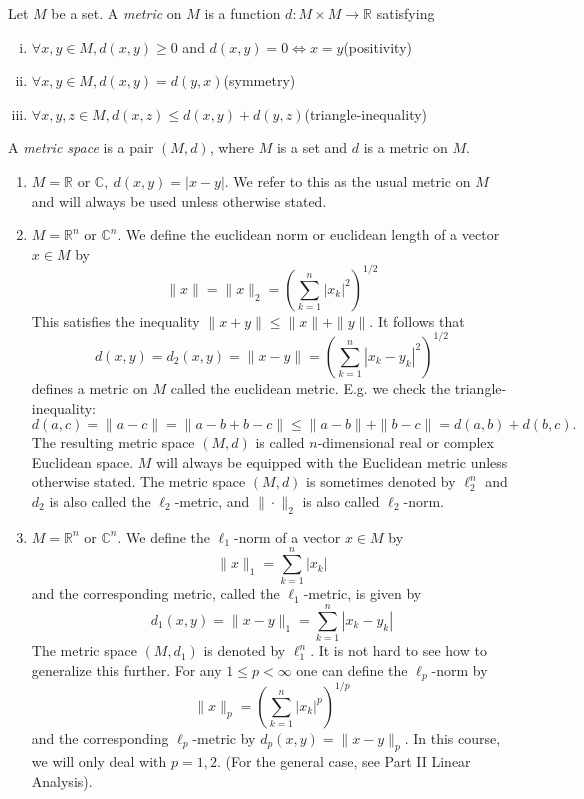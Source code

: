 \documentclass[a4paper,11pt]{article}
\begin{document}
\begin{definition}
    Let $M$ be a set. A \textit{metric} on $M$ is a function $d: M \times M \rightarrow \mathbb{R}$ satisfying
    \begin{enumerate}[(i)]
        \item $\forall x, y \in M, d(x, y) \geqslant 0$ and $d(x, y)=0 \Longleftrightarrow x=y$\hfill (positivity)
        \item $\forall x, y \in M, d(x, y)=d(y, x)$\hfill (symmetry)
        \item $\forall x, y, z \in M, d(x, z) \leqslant d(x, y)+d(y, z)$\hfill(triangle-inequality)
    \end{enumerate}
    A \textit{metric space} is a pair $(M, d)$, where $M$ is a set and $d$ is a metric on $M$.
\end{definition}
\begin{example}
    \begin{enumerate}
        \item $M=\mathbb{R}$ or $\mathbb{C},\ d(x, y)=|x-y|$. We refer to this as the usual metric on $M$ and will always be used unless otherwise stated.
        \item $M=\mathbb{R}^{n}$ or $\mathbb{C}^{n} .$ We define the euclidean norm or euclidean length of a vector $x \in M$ by
        \[
        \|x\|=\|x\|_{2}=\left(\sum_{k=1}^{n}\left|x_{k}\right|^{2}\right)^{1 / 2}
        \]
        This satisfies the inequality $\|x+y\| \leqslant\|x\|+\|y\|$. It follows that
        \[
        d(x, y)=d_{2}(x, y)=\|x-y\|=\left(\sum_{k=1}^{n}\left|x_{k}-y_{k}\right|^{2}\right)^{1 / 2}
        \]
        defines a metric on $M$ called the euclidean metric. E.g. we check the triangle-inequality:
        \[
        d(a, c)=\|a-c\|=\|a-b+b-c\| \leqslant\|a-b\|+\|b-c\|=d(a, b)+d(b, c).
        \]
        The resulting metric space $(M, d)$ is called $n$-dimensional real or complex Euclidean space. $M$ will always be equipped with the Euclidean metric unless otherwise stated. The metric space $(M, d)$ is sometimes denoted by $\ell_{2}^{n}$ and $d_{2}$ is also called the $\ell_{2}$-metric, and $\|\cdot\|_{2}$ is also called $\ell_{2}$-norm.
        \item $M=\mathbb{R}^{n}$ or $\mathbb{C}^{n} .$ We define the $\ell_{1}$-norm of a vector $x \in M$ by
        \[
        \|x\|_{1}=\sum_{k=1}^{n}\left|x_{k}\right|
        \]
        and the corresponding metric, called the $\ell_{1}$-metric, is given by
        \[
        d_{1}(x, y)=\|x-y\|_{1}=\sum_{k=1}^{n}\left|x_{k}-y_{k}\right|
        \]
        The metric space $\left(M, d_{1}\right)$ is denoted by $\ell_{1}^{n}$. It is not hard to see how to generalize this further. For any $1 \leqslant p<\infty$ one can define the $\ell_{p}$-norm by
        \[
        \|x\|_{p}=\left(\sum_{k=1}^{n}\left|x_{k}\right|^{p}\right)^{1 / p}
        \]
        and the corresponding $\ell_{p}$-metric by $d_{p}(x, y)=\|x-y\|_{p} .$ In this course, we will only deal with $p=1,2$. (For the general case, see Part II Linear Analysis).


\end{enumerate}
\end{example}
\end{document}
